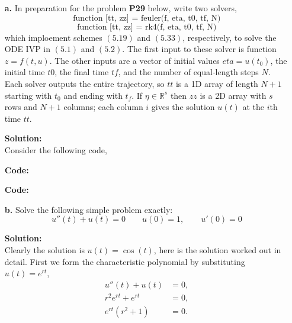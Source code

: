 \documentclass[12pt]{article}
\makeatletter
\theoremstyle{homework}
\newenvironment{exercise}[1]
{\def\@currentlabel{#1}\exercisecore}
{\endexercisecore}
\newcommand{\localhead}[1]{\par\smallskip\noindent\textbf{#1}\nobreak\\}%
\newcommand\solution{\localhead{Solution:}}
\newcommand{\Reals}{\ensuremath{\mathbb R}}
\let\RR\Reals
\makeatother
\begin{document}
\begin{exercise}{Problem P27}
  \begin{enumerate}
    \item[\textbf{a.}] In preparation for the problem \textbf{P29} below, write two solvers, 
    \begin{equation*}
      \text{function [tt, zz] = feuler(f, eta, t0, tf, N)}
    \end{equation*}
    \begin{equation*}
      \text{function [tt, zz] = rk4(f, eta, t0, tf, N)}
    \end{equation*}
    which imploement schemes $(5.19)$ and $(5.33)$, respectively, to solve the ODE IVP in
    $(5.1)$ and $(5.2)$. The first input to these solver is function $z = f(t, u)$. The other inputs 
    are a vector of initial values $eta = u(t_0)$, the initial time $t0$, the final time $tf$, and the number 
    of equal-length steps $N$. Each solver outputs the entire trajectory, so $tt$ is a 1D array of length $N+1$
    starting with $t_0$ and ending with $t_f$. If $\eta \in \RR^s$ then $zz$ is a 2D array with $s$ rows and $N + 1$
    columns; each column $i$ gives the solution $u(t)$ at the $i$th time $tt$. 
    \solution Consider the following code, 

    \textbf{Code:}
    \begin{center}
      
    \end{center}



    \textbf{Code:}
    \begin{center}
      
    \end{center}







    \item[\textbf{b.}] Solve the following simple problem exactly:
    \begin{equation*}
      u''(t) + u(t) = 0 \qquad u(0) = 1,\qquad u'(0) = 0
    \end{equation*}
    \solution
    Clearly the solution is $u(t) = \cos(t)$, here is the solution worked out in detail. First we form the characteristic polynomial by substituting $u(t) = e^{rt}$,
    \begin{align*}
      u''(t) + u(t) &= 0,\\
      r^2e^{rt} + e^{rt} &= 0,\\
      e^{rt}(r^2 + 1) &= 0.
    \end{align*}


\end{enumerate}
\end{exercise}
\end{document}
